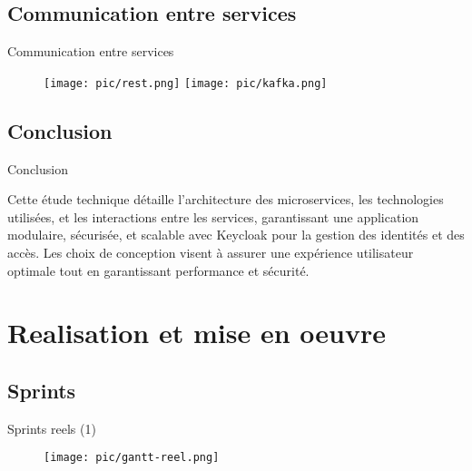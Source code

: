 \documentclass[aspectratio=169]{beamer}
\begin{document}
\subsection{Communication entre services}
\begin{frame}{Communication entre services}
   \begin{figure}[htpb]
        \centering
        \texttt{[image: pic/rest.png]}
         \hspace{0.1\textwidth}
         \texttt{[image: pic/kafka.png]}
    \end{figure}
\end{frame}

\subsection{Conclusion}
\begin{frame}{Conclusion}

    Cette étude technique détaille l'architecture des microservices, les technologies utilisées, et les interactions entre les services, garantissant une application modulaire, sécurisée, et scalable avec Keycloak pour la gestion des identités et des accès. Les choix de conception visent à assurer une expérience utilisateur optimale tout en garantissant performance et sécurité.
\end{frame}

\section{Realisation et mise en oeuvre}


\subsection{Sprints}
\begin{frame}{Sprints reels (1)}
 
    \begin{figure}[htpb]
           \centering
           \texttt{[image: pic/gantt-reel.png]}
       \end{figure}
   \end{frame}
\end{document}
